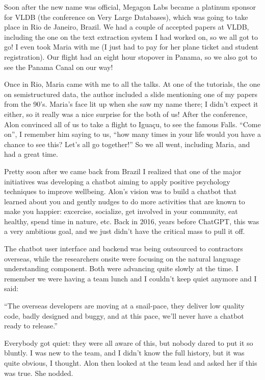 \documentclass[12pt]{book}
\begin{document}
Soon after the new name was official, Megagon Labs became a platinum
sponsor for VLDB (the conference on Very Large Databases), which was
going to take place in Rio de Janeiro, Brazil. We had a couple of
accepted papers at VLDB, including the one on the text extraction system
I had worked on, so we all got to go! I even took Maria with me (I just
had to pay for her plane ticket and student registration). Our flight
had an eight hour stopover in Panama, so we also got to see the Panama
Canal on our way!

Once in Rio, Maria came with me to all the talks. At one of the
tutorials, the one on semistructured data, the author included a slide
mentioning one of my papers from the 90's. Maria's face lit up when she
saw my name there; I didn't expect it either, so it really was a nice
surprise for the both of us! After the conference, Alon convinced all of
us to take a flight to Iguaçu, to see the famous Falls. ``Come on'', I
remember him saying to us, ``how many times in your life would you have
a chance to see this? Let's all go together!'' So we all went, including
Maria, and had a great time.

Pretty soon after we came back from Brazil I realized that one of the
major initiatives was developing a chatbot aiming to apply positive
psychology techniques to improve wellbeing. Alon's vision was to build a
chatbot that learned about you and gently nudges to do more activities
that are known to make you happier: excercise, socialize, get involved
in your community, eat healthy, spend time in nature, etc. Back in 2016,
years before ChatGPT, this was a very ambitious goal, and we just didn't
have the critical mass to pull it off.

The chatbot user interface and backend was being outsourced to
contractors overseas, while the researchers onsite were focusing on the
natural language understanding component. Both were advancing quite
slowly at the time. I remember we were having a team lunch and I
couldn't keep quiet anymore and I said:

``The overseas developers are moving at a snail-pace, they deliver low
quality code, badly designed and buggy, and at this pace, we'll never
have a chatbot ready to release.''

Everybody got quiet: they were all aware of this, but nobody dared to
put it so bluntly. I was new to the team, and I didn't know the full
history, but it was quite obvious, I thought. Alon then looked at the
team lead and asked her if this was true. She nodded.
\end{document}
